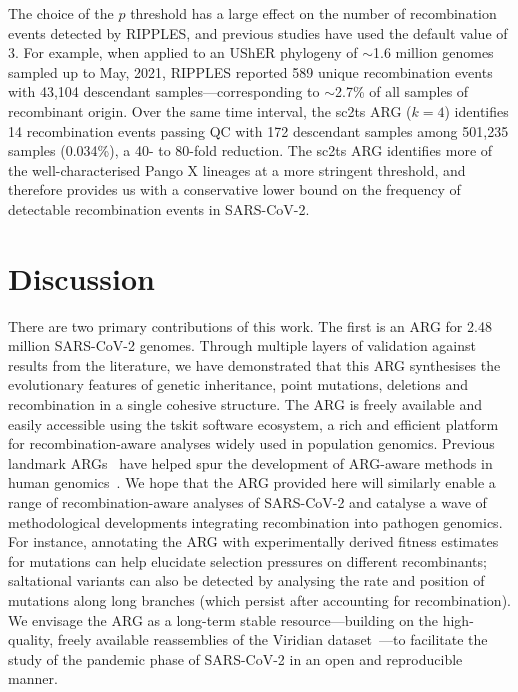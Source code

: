 \documentclass[12pt]{article}
\begin{document}
The choice of the $p$ threshold has a large effect
on the number of recombination events detected by RIPPLES, and
previous studies have used the default value of
$3$\cite{Turakhia2022,Smith2023tracking}.
For example, when applied to an UShER phylogeny of
$\sim$1.6 million genomes sampled up to May, 2021,
RIPPLES reported 589 unique recombination events with 43,104 descendant
samples---corresponding to $\sim$2.7\% of all samples of recombinant origin.
Over the same time interval, the sc2ts ARG ($k=4$) identifies
14 recombination events passing QC with
172 descendant samples among 501,235 samples (0.034\%),
a 40- to 80-fold reduction.
The sc2ts ARG identifies more of the well-characterised Pango X lineages
at a more stringent threshold, and therefore provides us with a
conservative lower bound
on the frequency of detectable recombination events in SARS-CoV-2.

\section*{Discussion}
There are two primary contributions of this work. The first is an
ARG for 2.48 million SARS-CoV-2 genomes.
Through multiple layers of validation against results from the
literature, we have demonstrated that this ARG synthesises
the evolutionary features of genetic inheritance, point mutations,
deletions and recombination in a single cohesive structure.
The ARG is freely available and easily accessible using the
tskit software ecosystem, a rich and efficient platform for
recombination-aware analyses widely used in population genomics.
Previous landmark ARGs~\cite{Wohns2022,Anderson2023genes}
have helped spur the development of ARG-aware methods in human
genomics~\cite{Mejia2025using,Grundler2025geographic,
Lehmann2025args,Terhorst2025accelerated}.
We hope that the ARG provided here will similarly
enable a range of recombination-aware analyses of SARS-CoV-2 and
catalyse a wave of methodological developments integrating
recombination into pathogen genomics.
For instance, annotating the ARG with experimentally derived
fitness estimates for mutations can help elucidate selection
pressures on different recombinants;
saltational variants can also be detected by analysing the rate and position of mutations along long
branches (which persist after accounting for recombination).
We envisage the ARG as a long-term stable resource---building on the
high-quality, freely available reassemblies of
the Viridian dataset~\cite{Hunt2024}---to facilitate the study
of the pandemic phase of SARS-CoV-2 in an open and reproducible manner.
\end{document}
